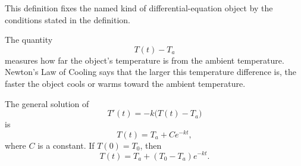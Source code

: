 \begin{remark*}
This definition fixes the named kind of differential-equation object by the
conditions stated in the definition.
\end{remark*}

\NoLocalDependencies

\begin{remark*}[Interpretation]
The quantity
\[
T(t)-T_a
\]
measures how far the object's temperature is from the ambient temperature. Newton's Law of Cooling says that the larger this temperature difference is, the faster the object cools or warms toward the ambient temperature.
\end{remark*}

\begin{example*}
The general solution of
\[
T'(t)=-k\bigl(T(t)-T_a\bigr)
\]
is
\[
T(t)=T_a+Ce^{-kt},
\]
where $C$ is a constant. If $T(0)=T_0$, then
\[
T(t)=T_a+(T_0-T_a)e^{-kt}.
\]
\end{example*}
